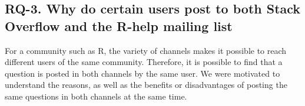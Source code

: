 
\subsection{RQ-3. Why do certain users post to both Stack Overflow and the R-help mailing list}


    For a community such as R, the variety of channels makes it possible to reach different users of the same community.
    Therefore, it is possible to find that a question is posted in both channels by the same user.
    We were motivated to understand the reasons, as well as the benefits or disadvantages of posting the same questions in both channels at the same time.

